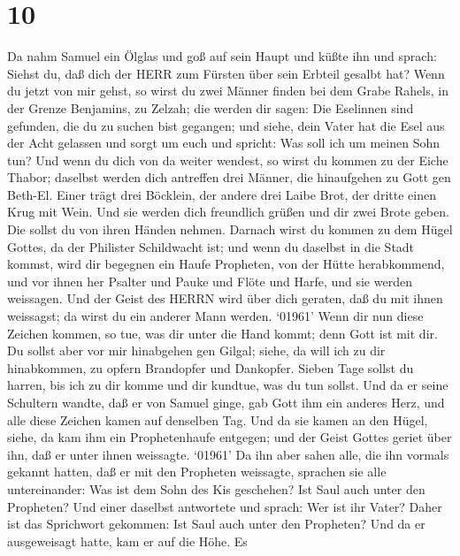 \hypertarget{section-9}{%
\section{10}\label{section-9}}

 Da nahm Samuel ein Ölglas und goß auf sein Haupt und küßte
ihn und sprach: Siehst du, daß dich der HERR zum Fürsten über sein
Erbteil gesalbt hat?  Wenn du jetzt von mir gehst, so wirst
du zwei Männer finden bei dem Grabe Rahels, in der Grenze Benjamins, zu
Zelzah; die werden dir sagen: Die Eselinnen sind gefunden, die du zu
suchen bist gegangen; und siehe, dein Vater hat die Esel aus der Acht
gelassen und sorgt um euch und spricht: Was soll ich um meinen Sohn tun?
 Und wenn du dich von da weiter wendest, so wirst du kommen
zu der Eiche Thabor; daselbst werden dich antreffen drei Männer, die
hinaufgehen zu Gott gen Beth-El. Einer trägt drei Böcklein, der andere
drei Laibe Brot, der dritte einen Krug mit Wein.  Und sie
werden dich freundlich grüßen und dir zwei Brote geben. Die sollst du
von ihren Händen nehmen.  Darnach wirst du kommen zu dem
Hügel Gottes, da der Philister Schildwacht ist; und wenn du daselbst in
die Stadt kommst, wird dir begegnen ein Haufe Propheten, von der Hütte
herabkommend, und vor ihnen her Psalter und Pauke und Flöte und Harfe,
und sie werden weissagen.  Und der Geist des HERRN wird über
dich geraten, daß du mit ihnen weissagst; da wirst du ein anderer Mann
werden.  `01961' Wenn dir nun diese Zeichen kommen, so tue,
was dir unter die Hand kommt; denn Gott ist mit dir.  Du
sollst aber vor mir hinabgehen gen Gilgal; siehe, da will ich zu dir
hinabkommen, zu opfern Brandopfer und Dankopfer. Sieben Tage sollst du
harren, bis ich zu dir komme und dir kundtue, was du tun sollst.
 Und da er seine Schultern wandte, daß er von Samuel ginge,
gab Gott ihm ein anderes Herz, und alle diese Zeichen kamen auf
denselben Tag.  Und da sie kamen an den Hügel, siehe, da
kam ihm ein Prophetenhaufe entgegen; und der Geist Gottes geriet über
ihn, daß er unter ihnen weissagte.  `01961' Da ihn aber
sahen alle, die ihn vormals gekannt hatten, daß er mit den Propheten
weissagte, sprachen sie alle untereinander: Was ist dem Sohn des Kis
geschehen? Ist Saul auch unter den Propheten?  Und einer
daselbst antwortete und sprach: Wer ist ihr Vater? Daher ist das
Sprichwort gekommen: Ist Saul auch unter den Propheten? 
Und da er ausgeweisagt hatte, kam er auf die Höhe.  Es
